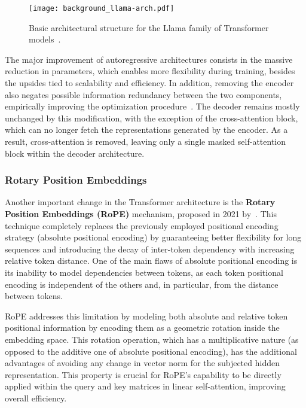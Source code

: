 \begin{figure}[t!]
    \centering
    \texttt{[image: background\_llama-arch.pdf]}
    \caption{Basic architectural structure for the Llama family of Transformer models~\cite{touvron2023,dubey2024}.}
    \label{fig:background_llama-arch}
\end{figure}

The major improvement of autoregressive architectures consists in the massive reduction in parameters, which enables more flexibility during training, besides the upsides tied to scalability and efficiency.
In addition, removing the encoder also negates possible information redundancy between the two components, empirically improving the optimization procedure~\citet{liu2018}.
The decoder remains mostly unchanged by this modification, with the exception of the cross-attention block, which can no longer fetch the representations generated by the encoder.
As a result, cross-attention is removed, leaving only a single masked self-attention block within the decoder architecture.

\subsubsection*{Rotary Position Embeddings}

Another important change in the Transformer architecture is the \textbf{Rotary Position Embeddings (RoPE)} mechanism, proposed in 2021 by~\citet{su2024}.
This technique completely replaces the previously employed positional encoding strategy (absolute positional encoding) by guaranteeing better flexibility for long sequences and introducing the decay of inter-token dependency with increasing relative token distance.
One of the main flaws of absolute positional encoding is its inability to model dependencies between tokens, as each token positional encoding is independent of the others and, in particular, from the distance between tokens.

RoPE addresses this limitation by modeling both absolute and relative token positional information by encoding them as a geometric rotation inside the embedding space.
This rotation operation, which has a multiplicative nature (as opposed to the additive one of absolute positional encoding), has the additional advantages of avoiding any change in vector norm for the subjected hidden representation.
This property is crucial for RoPE's capability to be directly applied within the query and key matrices in linear self-attention, improving overall efficiency.

